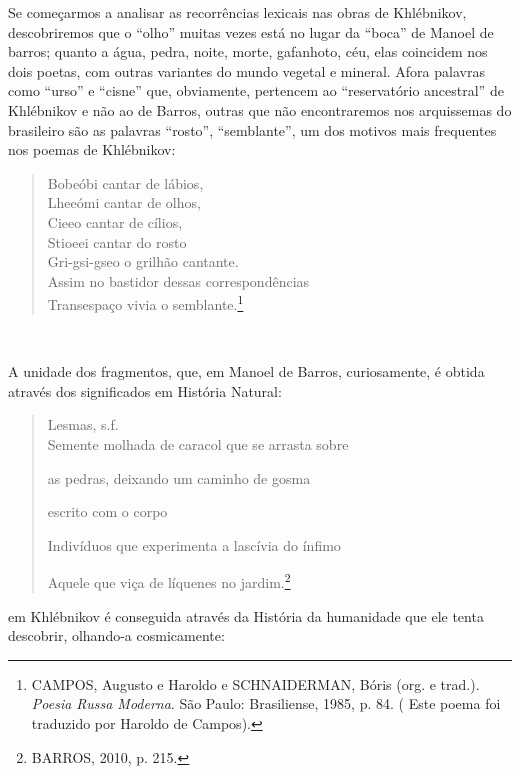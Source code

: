 Se começarmos a analisar as recorrências lexicais nas obras de
Khlébnikov, descobriremos que o ``olho'' muitas vezes está no lugar da
``boca'' de Manoel de barros; quanto a água, pedra, noite, morte,
gafanhoto, céu, elas coincidem nos dois poetas, com outras variantes do
mundo vegetal e mineral. Afora palavras como ``urso'' e ``cisne'' que,
obviamente, pertencem ao ``reservatório ancestral'' de Khlébnikov e não
ao de Barros, outras que não encontraremos nos arquissemas do brasileiro
são as palavras ``rosto'', ``semblante'', um dos motivos mais frequentes
nos poemas de Khlébnikov:

\begin{quote}
Bobeóbi cantar de lábios,\\
Lheeómi cantar de olhos,\\
Cieeo cantar de cílios,\\
Stioeei cantar do rosto\\
Gri-gsi-gseo o grilhão cantante.\\
\hspace*{0.333em}Assim no bastidor dessas correspondências\\
\hspace*{0.333em}Transespaço vivia o semblante.\footnote{CAMPOS, Augusto
  e Haroldo e SCHNAIDERMAN, Bóris (org. e trad.). \emph{Poesia Russa
  Moderna}. São Paulo: Brasiliense, 1985, p. 84. ( Este poema foi
  traduzido por Haroldo de Campos).}
\end{quote}

~~~~~~~~~~~~~

A unidade dos fragmentos, que, em Manoel de Barros, curiosamente, é
obtida através dos significados em História Natural:

\begin{quote}
Lesmas, s.f.~\\
Semente molhada de caracol que se arrasta sobre

as pedras, deixando um caminho de gosma

escrito com o corpo

Indivíduos que experimenta a lascívia do ínfimo

Aquele que viça de líquenes no jardim.\footnote{BARROS, 2010, p. 215.}
\end{quote}

em Khlébnikov é conseguida através da História da humanidade que ele
tenta descobrir, olhando-a cosmicamente:

